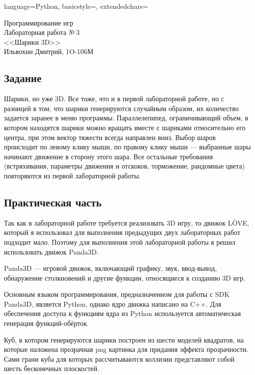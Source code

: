 \documentclass[12pt]{article}
\newcommand{\StudentName}{Ильвохин Дмитрий}
\newcommand{\Group}{1O-106М}
\newcommand{\CourseName}{Программирование игр}
\newcommand{\LabNum}{3}
\newcommand{\Subject}{Шарики 3D}
\begin{document}

\lstset
{
        language=Python,
        basicstyle=\footnotesize,%
        extendedchars=\true
}

\begin{flushright}
\Large{
	\CourseName \\
	Лабораторная работа №\,\LabNum \\
	<<\Subject>> \\
	\StudentName, \Group \\
}
\end{flushright}

\subsection*{Задание}
Шарики, но уже 3D. Все тоже, что и в первой лабораторной работе, но с разницей в том,
что шарики генерируются случайным образом, их количество задается заранее в меню программы.
Параллелепипед, ограничивающий объем, в котором находятся шарики можно вращать вместе с шариками
относительно его центра, при этом вектор тяжести всегда направлен вниз.
Выбор шаров происходит по левому клику мыши, по правому клику мыши --- выбранные шары начинают движение в
сторону этого шара.
Все остальные требования (встряхивания, параметры движения и отскоков, торможение, рандомные цвета)
повторяются из первой лабораторной работы.

\subsection*{Практическая часть}
Так как в лабораторной работе требуется реализовать 3D игру, то движок LÖVE, который я использовал
для выполнения предыдущих двух лабораторных работ подходит мало. Поэтому для выполнения этой лабораторной
работы я решил использовать движок Panda3D.

Panda3D — игровой движок, включающий графику, звук, ввод-вывод, обнаружение столкновений и другие функции,
относящиеся к созданию 3D игр.

Основным языком программирования, предназначенном для работы с SDK Panda3D, является Python,
однако ядро движка написано на C++. Для обеспечения доступа к функциям ядра из Python используется
автоматическая генерация функций-обёрток.~\cite{panda_wiki}

Куб, в котором генерируются шарики построен из шести моделей квадратов, на которые наложена прозрачная
png картинка для придания эффекта прозрачности. Сами грани куба для которых рассчитываются коллизии
представляют собой шесть бесконечных плоскостей.
\end{document}
